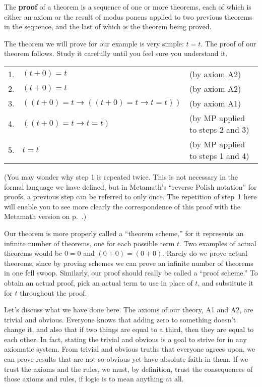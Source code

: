 The {\bf proof} of a theorem is a sequence of one or more
theorems, each of which is either an axiom or the result of modus ponens
applied to two previous theorems in the sequence, and the last of which is the
theorem being proved.

The theorem we will prove for our example is very simple:  $ t=t$.  The proof of
our theorem follows.  Study it carefully until you feel sure you
understand it.\label{zeroproof}

\begin{tabu} { l X X }
1. & $(t+0)=t$ & (by axiom A2) \\
2. & $(t+0)=t$ & (by axiom A2) \\
3. & $((t+0)=t \rightarrow ((t+0)=t\rightarrow t=t))$ & (by axiom A1) \\
4. & $((t+0)=t\rightarrow t=t)$ & (by MP applied to steps 2 and 3) \\
5. & $t=t$ & (by MP applied to steps 1 and 4) \\
\end{tabu}

(You may wonder why step 1 is repeated twice.  This is not necessary in the
formal language we have defined, but in Metamath's ``reverse Polish
notation'' for proofs, a previous step
can be referred to only once.  The repetition of step~1 here will enable you
to see more clearly the correspondence of this proof with the
Metamath version on p.~\pageref{demoproof}.)

Our theorem is more properly called a ``theorem scheme,'' for it represents an infinite number of theorems, one for each
possible term $ t$.  Two examples of actual theorems would be $0=0$ and
$(0+0)=(0+0)$.  Rarely do we prove actual theorems, since by proving schemes
we can prove an infinite number of theorems in one fell swoop.  Similarly, our
proof should really be called a ``proof scheme.''  To
obtain an actual proof, pick an actual term to use in place of $ t$, and
substitute it for $ t$ throughout the proof.

Let's discuss what we have done here.  The axioms of our theory,
A1 and A2, are trivial and obvious.  Everyone knows that adding zero to
something doesn't change it, and also that if two things are equal to a third,
then they are equal to each other. In fact, stating the trivial and obvious is
a goal to strive for in any axiomatic system.  From trivial and obvious truths
that everyone agrees upon, we can prove results that are not so obvious yet
have absolute faith in them.  If we trust the axioms and the rules, we must,
by definition, trust the consequences of those axioms and rules, if logic is
to mean anything at all.

